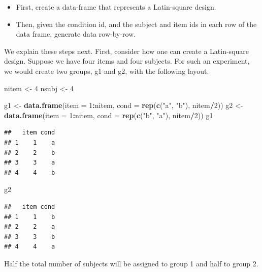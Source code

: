 \documentclass[12pt,]{krantz}
\newenvironment{Shaded}{\begin{snugshade}}{\end{snugshade}}
\newcommand{\DataTypeTok}[1]{\textcolor[rgb]{0.13,0.29,0.53}{#1}}
\newcommand{\DecValTok}[1]{\textcolor[rgb]{0.00,0.00,0.81}{#1}}
\newcommand{\KeywordTok}[1]{\textcolor[rgb]{0.13,0.29,0.53}{\textbf{#1}}}
\newcommand{\NormalTok}[1]{#1}
\newcommand{\OperatorTok}[1]{\textcolor[rgb]{0.81,0.36,0.00}{\textbf{#1}}}
\newcommand{\StringTok}[1]{\textcolor[rgb]{0.31,0.60,0.02}{#1}}
\providecommand{\tightlist}{%
  \setlength{\itemsep}{0pt}\setlength{\parskip}{0pt}}
\begin{document}
\begin{itemize}
\tightlist
\item
  First, create a data-frame that represents a Latin-square design.
\item
  Then, given the condition id, and the subject and item ids in each row of the data frame, generate data row-by-row.
\end{itemize}

We explain these steps next. First, consider how one can create a Latin-square design. Suppose we have four items and four subjects. For such an experiment, we would create two groups, g1 and g2, with the following layout.

\begin{Shaded}
\begin{Highlighting}[]
\NormalTok{nitem <-}\StringTok{ }\DecValTok{4}
\NormalTok{nsubj <-}\StringTok{ }\DecValTok{4}

\NormalTok{g1 <-}\StringTok{ }\KeywordTok{data.frame}\NormalTok{(}\DataTypeTok{item =} \DecValTok{1}\OperatorTok{:}\NormalTok{nitem, }\DataTypeTok{cond =} \KeywordTok{rep}\NormalTok{(}\KeywordTok{c}\NormalTok{(}\StringTok{"a"}\NormalTok{, }
  \StringTok{"b"}\NormalTok{), nitem}\OperatorTok{/}\DecValTok{2}\NormalTok{))}
\NormalTok{g2 <-}\StringTok{ }\KeywordTok{data.frame}\NormalTok{(}\DataTypeTok{item =} \DecValTok{1}\OperatorTok{:}\NormalTok{nitem, }\DataTypeTok{cond =} \KeywordTok{rep}\NormalTok{(}\KeywordTok{c}\NormalTok{(}\StringTok{"b"}\NormalTok{, }
  \StringTok{"a"}\NormalTok{), nitem}\OperatorTok{/}\DecValTok{2}\NormalTok{))}
\NormalTok{g1}
\end{Highlighting}
\end{Shaded}

\begin{verbatim}
##   item cond
## 1    1    a
## 2    2    b
## 3    3    a
## 4    4    b
\end{verbatim}

\begin{Shaded}
\begin{Highlighting}[]
\NormalTok{g2}
\end{Highlighting}
\end{Shaded}

\begin{verbatim}
##   item cond
## 1    1    b
## 2    2    a
## 3    3    b
## 4    4    a
\end{verbatim}

Half the total number of subjects will be assigned to group 1 and half to group 2.
\end{document}
